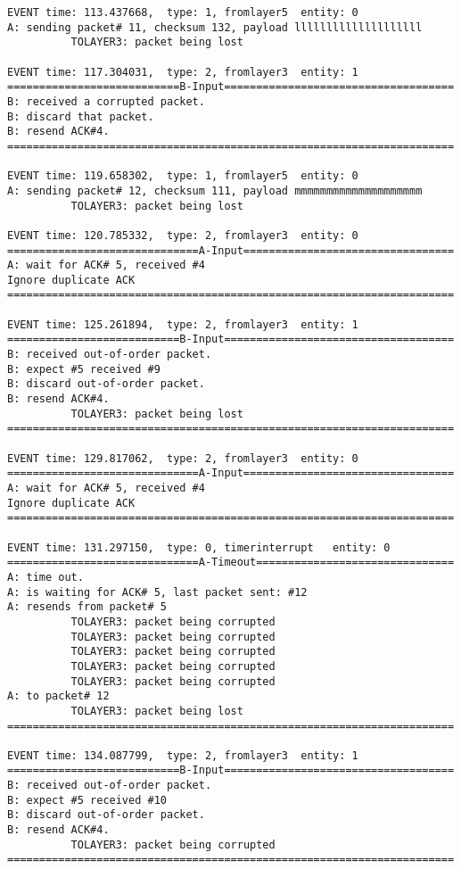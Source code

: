 \documentclass[12pt]{article}
\begin{document}
\begin{verbatim}
EVENT time: 113.437668,  type: 1, fromlayer5  entity: 0
A: sending packet# 11, checksum 132, payload llllllllllllllllllll
          TOLAYER3: packet being lost

EVENT time: 117.304031,  type: 2, fromlayer3  entity: 1
===========================B-Input====================================
B: received a corrupted packet.
B: discard that packet.
B: resend ACK#4.
======================================================================

EVENT time: 119.658302,  type: 1, fromlayer5  entity: 0
A: sending packet# 12, checksum 111, payload mmmmmmmmmmmmmmmmmmmm
          TOLAYER3: packet being lost

EVENT time: 120.785332,  type: 2, fromlayer3  entity: 0
==============================A-Input=================================
A: wait for ACK# 5, received #4
Ignore duplicate ACK
======================================================================

EVENT time: 125.261894,  type: 2, fromlayer3  entity: 1
===========================B-Input====================================
B: received out-of-order packet.
B: expect #5 received #9
B: discard out-of-order packet.
B: resend ACK#4.
          TOLAYER3: packet being lost
======================================================================

EVENT time: 129.817062,  type: 2, fromlayer3  entity: 0
==============================A-Input=================================
A: wait for ACK# 5, received #4
Ignore duplicate ACK
======================================================================

EVENT time: 131.297150,  type: 0, timerinterrupt   entity: 0
==============================A-Timeout===============================
A: time out. 
A: is waiting for ACK# 5, last packet sent: #12
A: resends from packet# 5 
          TOLAYER3: packet being corrupted
          TOLAYER3: packet being corrupted
          TOLAYER3: packet being corrupted
          TOLAYER3: packet being corrupted
          TOLAYER3: packet being corrupted
A: to packet# 12
          TOLAYER3: packet being lost
======================================================================

EVENT time: 134.087799,  type: 2, fromlayer3  entity: 1
===========================B-Input====================================
B: received out-of-order packet.
B: expect #5 received #10
B: discard out-of-order packet.
B: resend ACK#4.
          TOLAYER3: packet being corrupted
======================================================================


\end{verbatim}
\end{document}
